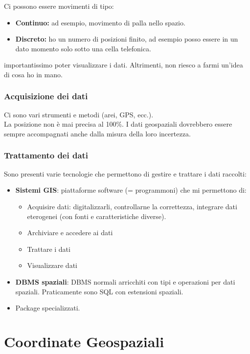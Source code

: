 \documentclass[a4paper,12pt]{article}
\begin{document}
Ci possono essere movimenti di tipo:
\begin{itemize}
\item \textbf{Continuo:} ad esempio, movimento di palla nello spazio.
\item \textbf{Discreto:} ho un numero di posizioni finito, ad esempio posso essere in un dato momento solo sotto una cella telefonica.
\end{itemize}

\E importantissimo poter visualizzare i dati. Altrimenti, non riesco a farmi un'idea di cosa ho in mano.

\subsubsection{Acquisizione dei dati}
Ci sono vari strumenti e metodi (arei, GPS, ecc.).\\
La posizione non è mai precisa al 100\%. I dati geospaziali dovrebbero essere sempre accompagnati anche dalla misura della loro incertezza.

\subsubsection{Trattamento dei dati}
Sono presenti varie tecnologie che permettono di gestire e trattare i dati raccolti:
\begin{itemize}
\item \textbf{Sistemi GIS}: piattaforme software (= programmoni) che mi permettono di:
	\begin{itemize}
		\item Acquisire dati: digitalizzarli, controllarne la correttezza, integrare dati eterogenei (con fonti e caratteristiche diverse).
		\item Archiviare e accedere ai dati
		\item Trattare i dati
		\item Visualizzare dati
	\end{itemize}
\item \textbf{DBMS spaziali}: DBMS normali arricchiti con tipi e operazioni per dati spaziali. Praticamente sono SQL con estensioni spaziali.
	
\item Package specializzati.
\end{itemize}

\section{Coordinate Geospaziali}
\end{document}

